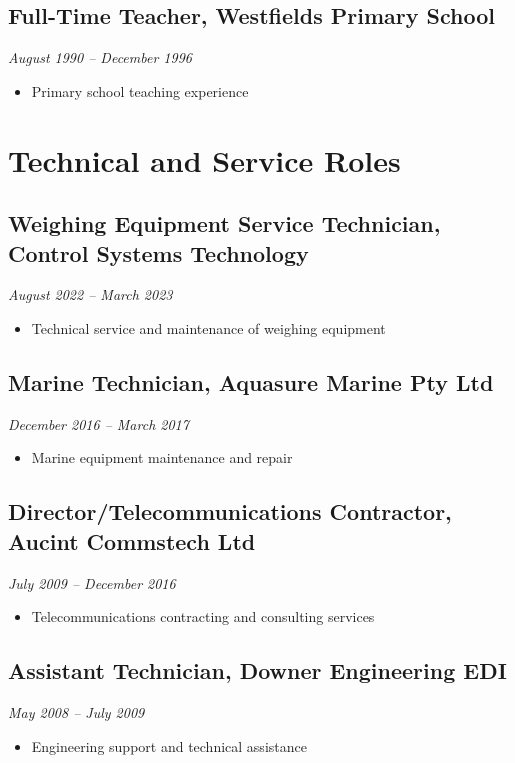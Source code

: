 \documentclass[11pt,a4paper]{article}
\begin{document}
\subsection*{Full-Time Teacher, Westfields Primary School}
\textit{August 1990 – December 1996}
\begin{itemize}
    \item Primary school teaching experience
\end{itemize}

\section*{Technical and Service Roles}

\subsection*{Weighing Equipment Service Technician, Control Systems Technology}
\textit{August 2022 – March 2023}
\begin{itemize}
    \item Technical service and maintenance of weighing equipment
\end{itemize}

\subsection*{Marine Technician, Aquasure Marine Pty Ltd}
\textit{December 2016 – March 2017}
\begin{itemize}
    \item Marine equipment maintenance and repair
\end{itemize}

\subsection*{Director/Telecommunications Contractor, Aucint Commstech Ltd}
\textit{July 2009 – December 2016}
\begin{itemize}
    \item Telecommunications contracting and consulting services
\end{itemize}

\subsection*{Assistant Technician, Downer Engineering EDI}
\textit{May 2008 – July 2009}
\begin{itemize}
    \item Engineering support and technical assistance
\end{itemize}
\end{document}
